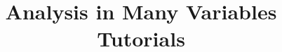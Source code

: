 \documentclass[a4paper, answers]{exam}
\title{Analysis in Many Variables Tutorials}
\author{}
\begin{document}
    \maketitle
    \begin{questions}
%       
        
    \end{questions}
\end{document}
